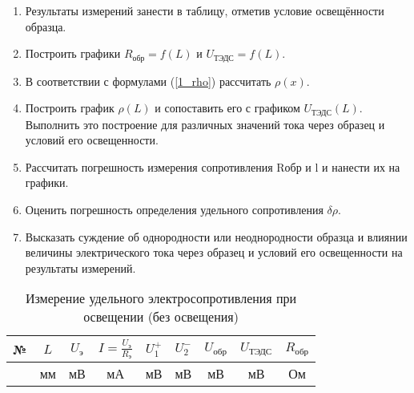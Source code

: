 \begin{enumerate}
\item Результаты измерений занести в таблицу, отметив условие освещённости образца.
\item Построить графики $R_{\text{обр}} = f(L)$ и $U_{\text{ТЭДС}} = f(L)$.
\item В соответствии с формулами (\ref{1_rho}) рассчитать $\rho(x)$.
\item Построить график $\rho(L)$ и сопоставить его с графиком $U_{\text{ТЭДС}}(L)$. Выполнить это построение для различных значений тока через образец и условий его освещенности.
\item Рассчитать погрешность измерения сопротивления Rобр и l и нанести их на графики.
\item Оценить погрешность определения удельного сопротивления $\delta \rho$.
\item Высказать суждение об однородности или неоднородности образца и влиянии величины электрического тока через образец и условий его освещенности на результаты измерений.
\end{enumerate}

\begin{table}[h!]
\caption{Измерение удельного электросопротивления при освещении (без освещения)}
\begin{center}
\begin{tabular}{c|c|c|c|c|c|c|c|c}
№ & $L$ & $U_{\text{э}}$ & $I = \frac{U_{\text{э}}}{R_{\text{э}}}$ & $U_{1}^{+}$ & $U_{2}^{-}$ & $U_{\text{обр}}$ & $U_{\text{ТЭДС}}$ & $R_{\text{обр}}$ \\
\hline
& мм & мВ & мА & мВ & мВ & мВ & мВ & Ом \\
\hline
\end{tabular}
\end{center}
\label{1_table}
\end{table}

